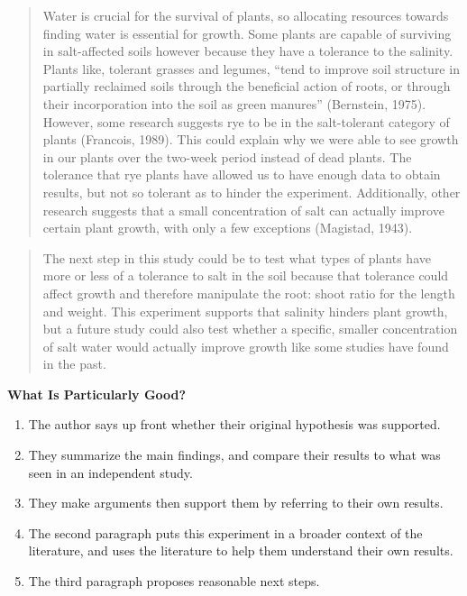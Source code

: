 \documentclass[
]{book}
\providecommand{\tightlist}{%
  \setlength{\itemsep}{0pt}\setlength{\parskip}{0pt}}
\begin{document}
\begin{quote}
Water is crucial for the survival of plants, so allocating resources towards finding water is essential for growth. Some plants are capable of surviving in salt-affected soils however because they have a tolerance to the salinity. Plants like, tolerant grasses and legumes, ``tend to improve soil structure in partially reclaimed soils through the beneficial action of roots, or through their incorporation into the soil as green manures'' (Bernstein, 1975). However, some research suggests rye to be in the salt-tolerant category of plants (Francois, 1989). This could explain why we were able to see growth in our plants over the two-week period instead of dead plants. The tolerance that rye plants have allowed us to have enough data to obtain results, but not so tolerant as to hinder the experiment. Additionally, other research suggests that a small concentration of salt can actually improve certain plant growth, with only a few exceptions (Magistad, 1943).
\end{quote}

\begin{quote}
The next step in this study could be to test what types of plants have more or less of a tolerance to salt in the soil because that tolerance could affect growth and therefore manipulate the root: shoot ratio for the length and weight. This experiment supports that salinity hinders plant growth, but a future study could also test whether a specific, smaller concentration of salt water would actually improve growth like some studies have found in the past.
\end{quote}

\textbf{What Is Particularly Good?}

\begin{enumerate}
\def\labelenumi{\arabic{enumi}.}
\tightlist
\item
  The author says up front whether their original hypothesis was supported.
\item
  They summarize the main findings, and compare their results to what was seen in an independent study.
\item
  They make arguments then support them by referring to their own results.
\item
  The second paragraph puts this experiment in a broader context of the literature, and uses the literature to help them understand their own results.
\item
  The third paragraph proposes reasonable next steps.
\end{enumerate}
\end{document}
